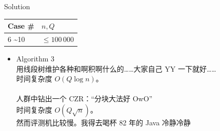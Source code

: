\documentclass[UTF8]{beamer}
\begin{document}
\begin{frame}{Solution}

\begin{tabularx}{\textwidth}{X|X} \hline
Case \# & $n, Q$ \\ \hline \hline
6 \textasciitilde 10 & $\leq 100\,000$ \\ \hline
\end{tabularx}
\begin{itemize}
    \item Algorithm 3 \\
        用线段树维护各种和啊积啊什么的……大家自己 YY 一下就好…… \\
        时间复杂度 $O(Q \log n)$。\\　\\
        \pause
        人群中钻出一个 CZR：“分块大法好 OwO” \\
        时间复杂度 $O(Q \sqrt n)$。\\
        \pause
        然而评测机比较慢。我得去喝杯 82 年的 Java 冷静冷静
\end{itemize}

\end{frame}
\end{document}
